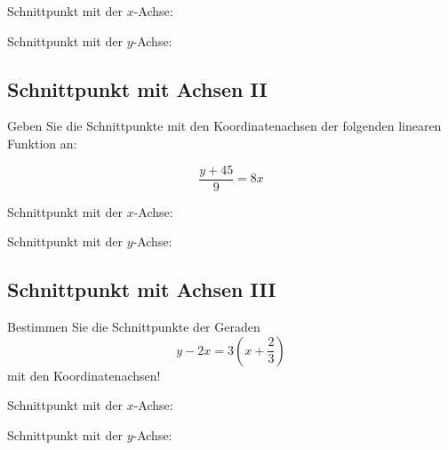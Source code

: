 \vspace{15mm}
Schnittpunkt mit der $x$-Achse: 

\vspace{5mm}

Schnittpunkt mit der $y$-Achse: 

\newpage
\subsection{Schnittpunkt mit Achsen II}
Geben Sie die Schnittpunkte mit den Koordinatenachsen der folgenden
linearen Funktion an:

$$\frac{y+45}9 = 8x$$

\vspace{15mm}
Schnittpunkt mit der $x$-Achse: 

\vspace{5mm}

Schnittpunkt mit der $y$-Achse: \LoesungsRaumLang{$\left(0\middle|-45\right)$}


\newpage

\subsection{Schnittpunkt mit Achsen III}
Bestimmen Sie die Schnittpunkte der Geraden
$$y-2x=3\left(x+\frac23\right)$$
mit den Koordinatenachsen!


Schnittpunkt mit der $x$-Achse: 

\vspace{5mm}
Schnittpunkt mit der $y$-Achse: 

